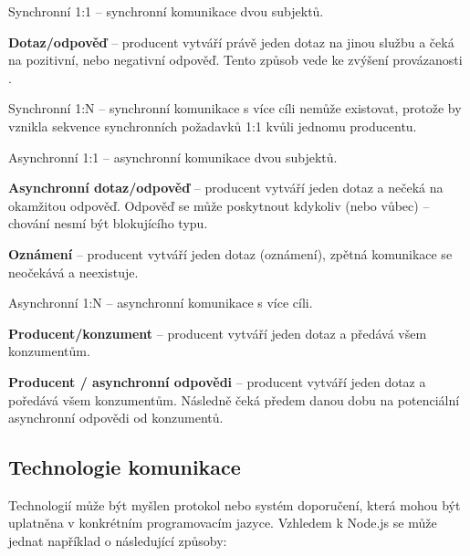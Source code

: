 \begin{dl}
   \item [Synchronní 1:1] – synchronní komunikace dvou subjektů.

   \begin{ul}
      \item \textbf{Dotaz/odpověď} – producent vytváří právě jeden dotaz na jinou službu a čeká na pozitivní, nebo negativní odpověď.
      Tento způsob vede ke zvýšení provázanosti .
   \end{ul}

   \item [Synchronní 1:N] – synchronní komunikace s více cíli nemůže existovat, protože by vznikla sekvence synchronních požadavků 1:1 kvůli jednomu producentu.

   \item [Asynchronní 1:1] – asynchronní komunikace dvou subjektů.

   \begin{ul}
      \item \textbf{Asynchronní dotaz/odpověď} – producent vytváří jeden dotaz a nečeká na okamžitou odpověď.
      Odpověď se může poskytnout kdykoliv (nebo vůbec) – chování nesmí být blokujícího typu.
      \item \textbf{Oznámení} – producent vytváří jeden dotaz (oznámení), zpětná komunikace se neočekává a neexistuje.
   \end{ul}

   \item [Asynchronní 1:N] – asynchronní komunikace s více cíli.

   \begin{ul}
      \item \textbf{Producent/konzument} – producent vytváří jeden dotaz a předává všem konzumentům.
      \item \textbf{Producent / asynchronní odpovědi} – producent vytváří jeden dotaz a poředává všem konzumentům.
      Následně čeká předem danou dobu na potenciální asynchronní odpovědi od konzumentů.
   \end{ul}
\end{dl}



\subsection{Technologie komunikace}\label{subsec:msa-communication-technology}
Technologií může být myšlen protokol nebo systém doporučení, která mohou být uplatněna v konkrétním programovacím jazyce.
Vzhledem k Node.js se může jednat například o následující způsoby:

